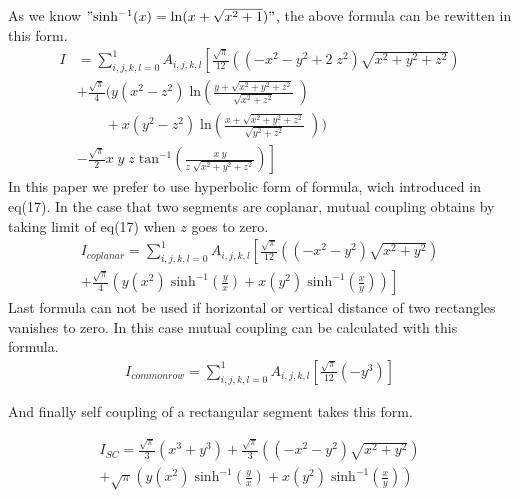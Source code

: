 \documentclass[twoside,twocolumn]{article}
\begin{document}
As we know $"\mathrm{sinh^{-1}}(x) = \mathrm{ln}(x+\sqrt{x^2 + 1})"$,
the above formula can be rewitten in this form.
\begin{equation}\label {eq:18}
\begin{array}{ll}
I&=\sum_{i,j,k,l=0}^1 A_{i,j,k,l}\left[\frac {\sqrt{\pi} } {12} \left((-x^2-y^2+2\;z^2)\sqrt{x^2 + y^2 + z^2} \right)\right.  \\

& + \frac {\sqrt{\pi} } {4} \bigg( y(x^2 - z^2)\;\mathrm{ln}(\frac{y+\sqrt{ {x^2 + y^2 + z^2}}}{\sqrt{x^2 + z^2}}\;)\\
&\ \ \ \ \ \ \ \ \ +x(y^2-z^2)\; \mathrm{ln}(\frac{x+\sqrt{ {x^2 + y^2 + z^2}}}{\sqrt{y^2 + z^2}}\;)  \bigg)\\ 
&- \left. \frac {\sqrt{\pi} } {2}x \;y\;z\;\mathrm{tan^{-1}}(\frac{x\;y}{z\;\sqrt{x^2+y^2 + z^2}} ) \right]

\end{array}
\end{equation}
In this paper we prefer to use hyperbolic form of formula, wich introduced in eq(17).
In the case that two segments are coplanar, mutual coupling obtains by taking limit of eq(17) when $z$ goes to zero.
\begin{equation}\label {eq:19}
\begin{array}{l}
I_{coplanar}=\sum_{i,j,k,l=0}^1 A_{i,j,k,l}\left[\frac {\sqrt{\pi} } {12} \left((-x^2-y^2)\sqrt{x^2 + y^2} \right) \right. \\

 + \left. \frac {\sqrt{\pi} } {4} \left( y(x^2 )\;\mathrm{sinh^{-1}}(\frac{y}{x })+x(y^2)\;\mathrm{sinh^{-1}}(\frac{x}{y})  \right) \right]
\end{array}
\end{equation}
Last formula can not be used if horizontal or vertical distance of two rectangles vanishes to zero. In this case mutual coupling can be calculated with this formula.
\begin{equation}\label {eq:20}
\begin{array}{l}
I_{commonrow}=\sum_{i,j,k,l=0}^1 A_{i,j,k,l}\left[\frac {\sqrt{\pi} } {12} (-y^3)    \right]
\end{array}
\end{equation}

And finally self coupling of a rectangular segment takes this form.

\begin{equation}\label {eq:21}
\begin{array}{l}
I_{SC} = \frac {\sqrt{\pi} } {3} (x^3+y^3)
+ \frac {\sqrt{\pi} } {3} \left((-x^2-y^2) \sqrt{x^2 + y^2} \right)\nonumber \\ +\sqrt{\pi} \left( y(x^2 )\;\mathrm{sinh^{-1}}(\frac{y}{x})+x(y^2)\;\mathrm{sinh^{-1}}(\frac{x}{y})  \right)
\end{array}
\end{equation}
\end{document}
